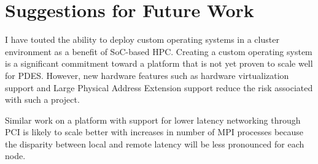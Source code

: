 \documentclass[11pt]{book}
\begin{document}
\section{\textbf{Suggestions for Future Work}}

I have touted the ability to deploy custom operating systems in a cluster
environment as a benefit of SoC-based HPC. Creating a custom operating
system is a significant commitment toward a platform that is not yet proven to
scale well for PDES. However, new hardware features such as hardware
virtualization support and Large Physical Address Extension support reduce the
risk associated with such a project.

Similar work on a platform with support for lower latency networking through PCI
is likely to scale better with increases in number of MPI processes because the
disparity between local and remote latency will be less pronounced for each
node.

\newpage
 
\end{document}
